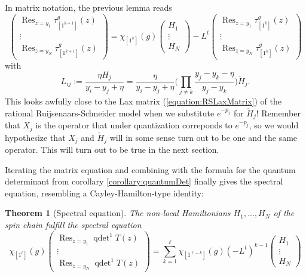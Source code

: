 \documentclass[11pt]{report}
\newtheorem{theorem}{Theorem}[section]
\theoremstyle{definition}
\theoremstyle{remark}
\theoremstyle{remark}
\begin{document}
In matrix notation, the previous lemma reads
\begin{equation*}
\begin{pmatrix}
\operatorname{Res}_{z=y_1} \tau_{[1^{k+1}]}^g(z) \\
\vdots \\
\operatorname{Res}_{z=y_N} \tau_{[1^{k+1}]}^g(z)
\end{pmatrix}
=
\chi_{[1^k]}(g)
\begin{pmatrix}
H_1 \\
\vdots \\
H_N
\end{pmatrix}
-L^t
\begin{pmatrix}
\operatorname{Res}_{z=y_1} \tau_{[1^k]}^g(z) \\
\vdots \\
\operatorname{Res}_{z=y_N} \tau_{[1^k]}^g(z)
\end{pmatrix}
\end{equation*}
with
\begin{equation*}
L_{ij} := \frac{\eta H_j}{y_i-y_j+\eta} = \frac{\eta}{y_i-y_j+\eta} \bigg( \prod_{j \neq k} \frac{y_j-y_k-\eta}{y_j-y_k} \bigg) \check H_j.
\end{equation*}
This looks awfully close to the Lax matrix (\ref{equation:RSLaxMatrix}) of the rational Ruijsenaars-Schneider model when we substitute $e^{-p_j}$ for $\check H_j$! Remember that $X_j$ is the operator that under quantization correponds to $e^{-p_j}$, so we would hypothesize that $X_j$ and $\check H_j$ will in some sense turn out to be one and the same operator. This will turn out to be true in the next section.

Iterating the matrix equation and combining with the formula for the quantum determinant from corollary \ref{corollary:quantumDet} finally gives the spectral equation, resembling a Cayley-Hamilton-type identity:

\begin{theorem}[Spectral equation]\label{theorem:spectralEq}
The non-local Hamiltonians $H_1,...,H_N$ of the spin chain fulfill the \emph{spectral equation}
\begin{equation*}
\chi_{[1^\ell]}(g)
\begin{pmatrix}
\operatorname{Res}_{z=y_1} \operatorname{qdet}^1 T(z) \\ \vdots \\ \operatorname{Res}_{z=y_N} \operatorname{qdet}^1 T(z)
\end{pmatrix}
= \sum_{k=1}^\ell \chi_{[1^{\ell-k}]}(g) (-L^t)^{k-1}
\begin{pmatrix}
H_1 \\ \vdots \\ H_N
\end{pmatrix}
\end{equation*}
\end{theorem}
\end{document}
